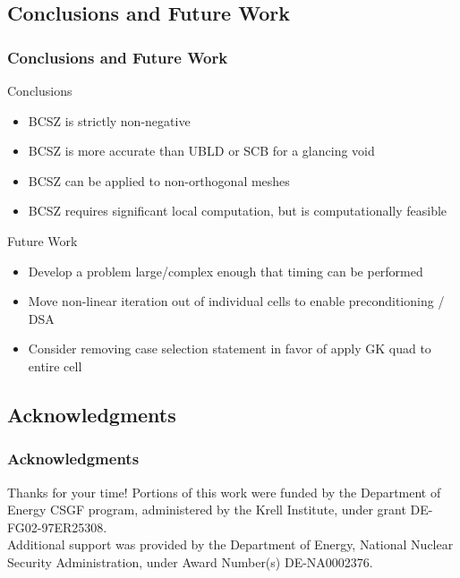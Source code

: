 \documentclass{beamer}
\newif\ifplacelogo %
\begin{document}
\subsection{Conclusions and Future Work}
\begin{frame}
\frametitle{Conclusions and Future Work}
Conclusions
\begin{itemize}
\item BCSZ is strictly non-negative
\item BCSZ is more accurate than UBLD or SCB for a glancing void
\item BCSZ can be applied to non-orthogonal meshes
\item BCSZ requires significant local computation, but is computationally feasible
\end{itemize}
Future Work
\begin{itemize}
\item Develop a problem large/complex enough that timing can be performed
\item Move non-linear iteration out of individual cells to enable preconditioning / DSA
\item Consider removing case selection statement in favor of apply GK quad to entire cell
\end{itemize}
\end{frame}

\placelogotrue

\subsection{Acknowledgments}
\begin{frame}
\frametitle{Acknowledgments}
Thanks for your time!
\vspace{0.3in}
Portions of this work were funded by the Department of Energy CSGF program, administered by the Krell Institute, under grant DE-FG02-97ER25308.
\\
\vspace{0.3in}
Additional support was provided by the Department of Energy, National Nuclear Security Administration, under Award Number(s) DE-NA0002376.

\end{frame}

\end{document}
